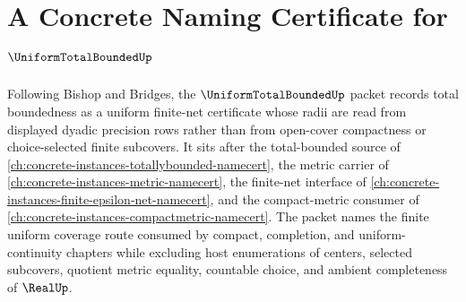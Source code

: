 \chapter{A Concrete Naming Certificate for $\UniformTotalBoundedUp$}
\label{ch:concrete-instances-uniform-total-bounded-namecert}

Following Bishop and Bridges, the $\UniformTotalBoundedUp$ packet records total boundedness as a uniform finite-net certificate whose radii are read from displayed dyadic precision rows rather than from open-cover compactness or choice-selected finite subcovers. It sits after the total-bounded source of \autoref{ch:concrete-instances-totallybounded-namecert}, the metric carrier of \autoref{ch:concrete-instances-metric-namecert}, the finite-net interface of \autoref{ch:concrete-instances-finite-epsilon-net-namecert}, and the compact-metric consumer of \autoref{ch:concrete-instances-compactmetric-namecert}. The packet names the finite uniform coverage route consumed by compact, completion, and uniform-continuity chapters while excluding host enumerations of centers, selected subcovers, quotient metric equality, countable choice, and ambient completeness of $\RealUp$.

